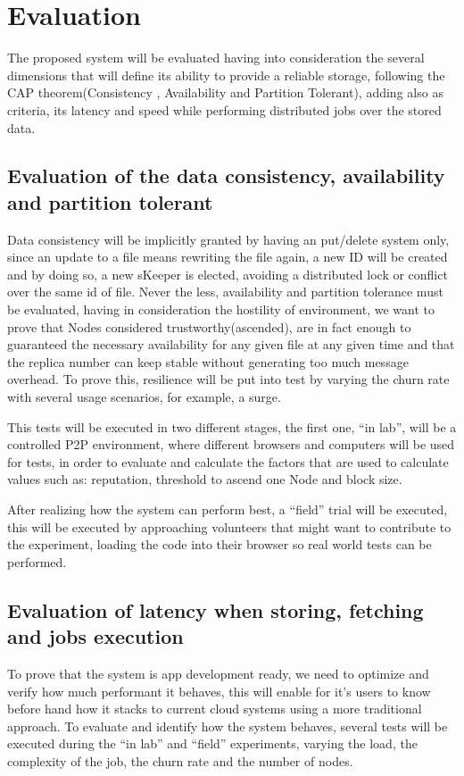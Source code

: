 
% 
% 

\section{Evaluation}

The proposed system will be evaluated having into consideration the several dimensions that will define its ability to provide a reliable storage, following the CAP theorem(Consistency , Availability and Partition Tolerant), adding also as criteria, its latency and speed while performing distributed jobs over the stored data.

\subsection{Evaluation of the data consistency, availability and partition tolerant}

Data consistency will be implicitly granted by having an put/delete system only, since an update to a file means rewriting the file again, a new ID will be created and by doing so, a new sKeeper is elected, avoiding a distributed lock or conflict over the same id of file. Never the less, availability and partition tolerance must be evaluated, having in consideration the hostility of environment, we want to prove that Nodes considered trustworthy(ascended), are in fact enough to guaranteed the necessary availability for any given file at any given time and that the replica number can keep stable without generating too much message overhead. To prove this, resilience will be put into test by varying the churn rate with several usage scenarios, for example, a surge.

This tests will be executed in two different stages, the first one, ``in lab'', will be a controlled P2P environment, where different browsers and computers will be used for tests, in order to evaluate and calculate the factors that are used to calculate values such as: reputation, threshold to ascend one Node and block size. 

After realizing how the system can perform best, a ``field'' trial will be executed, this will be executed by approaching volunteers that might want to contribute to the experiment, loading the code into their browser so real world tests can be performed.

\subsection{Evaluation of latency when storing, fetching and jobs execution}

To prove that the system is app development ready, we need to optimize and verify how much performant it behaves, this will enable for it's users to know before hand how it stacks to current cloud systems using a more traditional approach. To evaluate and identify how the system behaves, several tests will be executed during the ``in lab'' and ``field'' experiments, varying the load, the complexity of the job, the churn rate and the number of nodes.